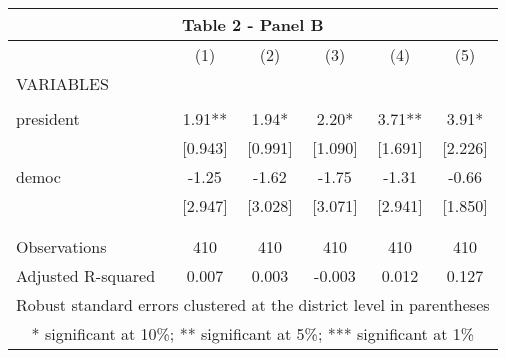 \begin{tabular}{lccccc}
\multicolumn{6}{c}{Table 2 - Panel B} \\ \hline
 & (1) & (2) & (3) & (4) & (5) \\
VARIABLES &  &  &  &  &  \\ \hline
 &  &  &  &  &  \\
president & 1.91** & 1.94* & 2.20* & 3.71** & 3.91* \\
 & [0.943] & [0.991] & [1.090] & [1.691] & [2.226] \\
democ & -1.25 & -1.62 & -1.75 & -1.31 & -0.66 \\
 & [2.947] & [3.028] & [3.071] & [2.941] & [1.850] \\
 &  &  &  &  &  \\
 &  &  &  &  &  \\
Observations & 410 & 410 & 410 & 410 & 410 \\
 Adjusted R-squared & 0.007 & 0.003 & -0.003 & 0.012 & 0.127 \\ \hline
\multicolumn{6}{c}{ Robust standard errors clustered at the district level in parentheses} \\
\multicolumn{6}{c}{ * significant at 10\%; ** significant at 5\%; *** significant at 1\%} \\
\end{tabular}
